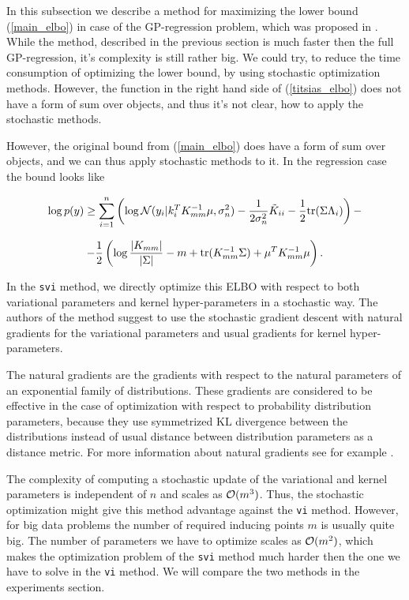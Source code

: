 In this subsection we describe a method for maximizing the lower bound (\ref{main_elbo}) in case of the GP-regression problem, which was proposed in \cite{BigData}. While the method, described in the previous section is much faster then the full GP-regression, it's complexity is still rather big. We could try, to reduce the time consumption of optimizing the lower bound, by using stochastic optimization methods. However, the function in the right hand side of (\ref{titsias_elbo}) does not have a form of sum over objects, and thus it's not clear, how to apply the stochastic methods.

However, the original bound from (\ref{main_elbo}) does have a form of sum over objects, and we can thus apply stochastic methods to it. In the regression case the bound looks like

$$\log p(y) \ge \sum_{i = 1}^{n} \left( \log \mathcal{N}(y_i | k_i^T K_{mm}^{-1} \mu, \sigma_n^2) - \frac 1 {2 \sigma_n^2} \tilde K_{ii} - \frac 1 2 \mbox{tr} (\Sigma \Lambda_i) \right) - $$

\begin{equation} \label{svi_elbo}
	-\frac 1 2 \left (\log \frac {|K_{mm}|} {|\Sigma|} - m + \mbox{tr}(K_{mm}^{-1} \Sigma) + \mu^T K_{mm}^{-1} \mu \right).
\end{equation}

In the \lstinline{svi} method, we directly optimize this ELBO with respect to both variational parameters and kernel hyper-parameters in a stochastic way. The authors of the method suggest to use the stochastic gradient descent with natural gradients for the variational parameters and usual gradients for kernel hyper-parameters.

The natural gradients are the gradients with respect to the natural parameters of an exponential family of distributions. These gradients are considered to be effective in the case of optimization with respect to probability distribution parameters, because they use symmetrized $\mbox{KL}$ divergence between the distributions instead of usual distance between distribution parameters as a distance metric. For more information about natural gradients see for example \cite{ExpFamilyGeom}.

The complexity of computing a stochastic update of the variational and kernel parameters is independent of $n$ and scales as $\mathcal{O}(m^3)$. Thus, the stochastic optimization might give this method advantage against the \lstinline{vi} method. However, for big data problems the number of required inducing points $m$ is usually quite big. The number of parameters we have to optimize scales as $\mathcal{O}(m^2)$, which makes the optimization problem of the \lstinline{svi} method much harder then the one we have to solve in the \lstinline{vi} method. We will compare the two methods in the experiments section.
